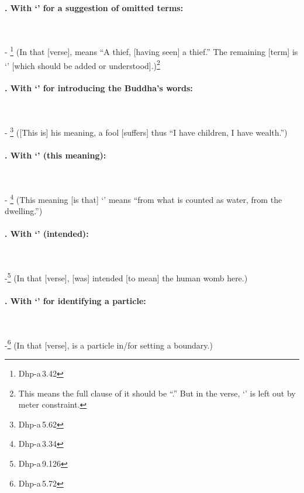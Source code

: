 \paragraph*{. With `' for a suggestion of omitted terms:}\ \par
- \footnote{Dhp-a\,3.42} (In that [verse],  means ``A thief, [having seen] a thief.'' The remaining [term] is `' [which should be added or understood].)\footnote{This means the full clause of it should be ``.'' But in the verse, `' is left out by meter constraint.}\par

\paragraph*{. With `' for introducing the Buddha's words:}\ \par
- \footnote{Dhp-a\,5.62} ([This is] his meaning, a fool [suffers] thus ``I have children, I have wealth.'')\par

\paragraph*{. With `' (this meaning):}\ \par
- \footnote{Dhp-a\,3.34} (This meaning [is that] `' means ``from what is counted as water, from the dwelling.'')\par

\paragraph*{. With `' (intended):}\ \par
-\footnote{Dhp-a\,9.126} (In that [verse],  [was] intended [to mean] the human womb here.)\par

\paragraph*{. With `' for identifying a particle:}\ \par
-\footnote{Dhp-a\,5.72} (In that [verse],  is a particle in/for setting a boundary.)\par

